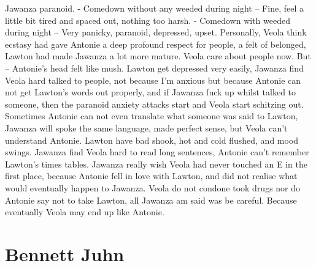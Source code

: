 \documentclass[12pt]{book}
\begin{document}
Jawanza paranoid. - Comedown without any weeded during night -- Fine, feel a little bit tired and spaced out, nothing too harsh. - Comedown with weeded during night -- Very panicky, paranoid, depressed, upset. Personally, Veola think ecstasy had gave Antonie a deep profound respect for people, a felt of belonged, Lawton had made Jawanza a lot more mature. Veola care about people now. But -- Antonie's head felt like mush. Lawton get depressed very easily, Jawanza find Veola hard talked to people, not because I'm anxious but because Antonie can not get Lawton's words out properly, and if Jawanza fuck up whilst talked to someone, then the paranoid anxiety attacks start and Veola start schitzing out. Sometimes Antonie can not even translate what someone was said to Lawton, Jawanza will spoke the same language, made perfect sense, but Veola can't understand Antonie. Lawton have bad shook, hot and cold flushed, and mood swings. Jawanza find Veola hard to read long sentences, Antonie can't remember Lawton's times tables. Jawanza really wish Veola had never touched an E in the first place, because Antonie fell in love with Lawton, and did not realise what would eventually happen to Jawanza. Veola do not condone took drugs nor do Antonie say not to take Lawton, all Jawanza am said was be careful. Because eventually Veola may end up like Antonie.



\chapter{Bennett Juhn}
\end{document}
